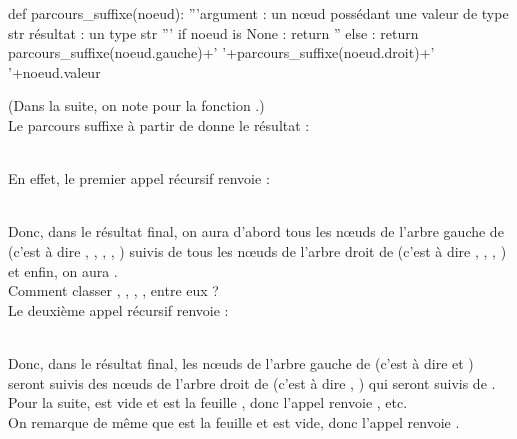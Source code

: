 \documentclass[11pt,a4paper,french,twoside]{PMCours}
\begin{document}
\begin{Python}
def parcours_suffixe(noeud):
	'''argument  : un nœud possédant une valeur de type str
	résultat : un type str '''  
	if noeud is None :
		return ''
	else :
		return parcours_suffixe(noeud.gauche)+' '+parcours_suffixe(noeud.droit)+' '+noeud.valeur
\end{Python} 
(Dans la suite, on note  pour la fonction  .)\\
Le parcours suffixe à partir de  donne le résultat :\\
\centerline{} \\
En effet, le premier appel récursif renvoie :\\
\centerline{}\\
Donc, dans le résultat final, on aura d'abord tous les nœuds de l'arbre gauche de  (c'est à dire , , , , ) suivis de tous les nœuds de l'arbre droit de  (c'est à dire , , , ) et enfin, on aura .\\
Comment classer , , , ,  entre eux ? \\
Le deuxième appel récursif renvoie :\\
\centerline{}\\
Donc, dans le résultat final, les nœuds de l'arbre gauche de  (c'est à dire  et ) seront suivis des nœuds de l'arbre droit de  (c'est à dire , ) qui seront suivis de .\\
Pour la suite,  est vide et  est la feuille , donc l'appel  renvoie , etc.\\
On remarque de même que  est la feuille  et  est vide, donc l'appel  renvoie .
\end{document}
